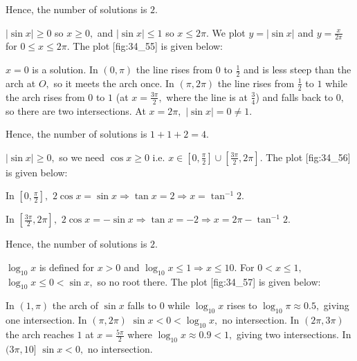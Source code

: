  \startplacefigure[title={Plot of $\cos x$ and $|x|$}, reference=fig:34_54]
    \externalfigure[34_54.pdf]
  \stopplacefigure

  Hence, the number of solutions is $2.$

\item $|\sin x|\geq 0$ so $x\geq 0,$ and $|\sin x|\leq 1$ so $x\leq 2\pi.$ We plot $y = |\sin x|$ and $y =
  \frac{x}{2\pi}$ for $0\leq x\leq 2\pi.$ The plot [fig:34_55] is given below:

  \startplacefigure[title={Plot of $|\sin x|$ and $\frac{x}{2\pi}$}, reference=fig:34_55]
    \externalfigure[34_55.pdf]
  \stopplacefigure

  $x = 0$ is a solution. In $(0, \pi)$ the line rises from $0$ to $\frac{1}{2}$ and is less steep than the arch at $O,$
  so it meets the arch once. In $(\pi, 2\pi)$ the line rises from $\frac{1}{2}$ to $1$ while the arch rises from $0$ to
  $1$ (at $x = \frac{3\pi}{2},$ where the line is at $\frac{3}{4}$) and falls back to $0,$ so there are two
  intersections. At $x = 2\pi,$ $|\sin x| = 0\neq 1.$

  Hence, the number of solutions is $1 + 1 + 2 = 4.$

\item $|\sin x|\geq 0,$ so we need $\cos x\geq 0$ i.e. $x\in\left[0, \frac{\pi}{2}\right]\cup\left[\frac{3\pi}{2},
  2\pi\right].$ The plot [fig:34_56] is given below:

  \startplacefigure[title={Plot of $2\cos x$ and $|\sin x|$}, reference=fig:34_56]
    \externalfigure[34_56.pdf]
  \stopplacefigure

  In $\left[0, \frac{\pi}{2}\right],$ $2\cos x = \sin x \Rightarrow \tan x = 2 \Rightarrow x = \tan^{-1}2.$

  In $\left[\frac{3\pi}{2}, 2\pi\right],$ $2\cos x = -\sin x \Rightarrow \tan x = -2 \Rightarrow x = 2\pi -
  \tan^{-1}2.$

  Hence, the number of solutions is $2.$

\item $\log_{10}x$ is defined for $x > 0$ and $\log_{10}x\leq 1 \Rightarrow x\leq 10.$ For $0 < x\leq 1,$
  $\log_{10}x\leq 0 < \sin x,$ so no root there. The plot [fig:34_57] is given below:

  \startplacefigure[title={Plot of $\sin x$ and $\log_{10}x$}, reference=fig:34_57]
    \externalfigure[34_57.pdf]
  \stopplacefigure

  In $(1, \pi)$ the arch of $\sin x$ falls to $0$ while $\log_{10}x$ rises to $\log_{10}\pi\approx 0.5,$ giving one
  intersection. In $(\pi, 2\pi)$ $\sin x < 0 < \log_{10}x,$ no intersection. In $(2\pi, 3\pi)$ the arch reaches $1$ at
  $x = \frac{5\pi}{2}$ where $\log_{10}x\approx 0.9 < 1,$ giving two intersections. In $(3\pi, 10]$ $\sin x < 0,$ no
  intersection.

